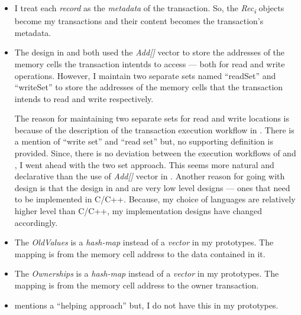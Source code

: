 \documentclass[../main]{subfiles}
\begin{document}
  \begin{itemize}

    \item I treat each {\em record} as the {\em metadata} of the transaction. So, the {\em Rec\textsubscript{i}} objects become my transactions and their content becomes the transaction's metadata.

    \item The design in \cite{Shavit1997} and \cite{weimerskirch2008software} both used the {\em Add[]} vector to store the addresses of the memory cells the transaction intentds to access --- both for read and write operations. However, I maintain two separate sets named ``readSet'' and ``writeSet'' to store the addresses of the memory cells that the transaction intends to read and write respectively. \par

    The reason for maintaining two separate sets for read and write locations is because of the description of the transaction execution workflow in \cite{weimerskirch2008software}. There is a mention of ``write set'' and ``read set'' but, no supporting definition is provided. Since, there is no deviation between the execution workflows of \cite{Shavit1997} and \cite{weimerskirch2008software}, I went ahead with the two set approach. This seems more natural and declarative than the use of {\em Add[]} vector in \cite{Shavit1997}. Another reason for going with design is that the design in \cite{Shavit1997} and \cite{weimerskirch2008software} are very low level designs --- ones that need to be implemented in C/C++. Because, my choice of languages are relatively higher level than C/C++, my implementation designs have changed accordingly. \par

    \item The {\em OldValues} is a {\em hash-map} instead of a {\em vector} in my prototypes. The mapping is from the memory cell address to the data contained in it.

    \item The {\em Ownerships} is a {\em hash-map} instead of a {\em vector} in my prototypes. The mapping is from the memory cell address to the owner transaction.

    \item \cite{Shavit1997} mentions a ``helping approach'' but, I do not have this in my prototypes.

  \end{itemize}
\end{document}
